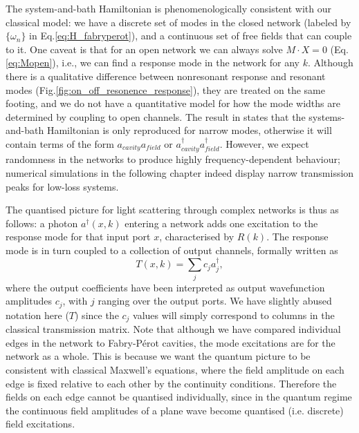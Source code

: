 The system-and-bath Hamiltonian is phenomenologically consistent with our  classical model: we have a discrete set of modes in the closed network (labeled by $\{\omega_n\}$ in Eq.\ref{eq:H_fabryperot}), and a continuous set of free fields that can couple to it. One caveat is that for an open network we can always solve $M\cdot X=0$ (Eq.\ref{eq:Mopen}), i.e., we can find a response mode in the network for any $k$. Although there is a qualitative difference between nonresonant response and resonant modes (Fig.\ref{fig:on_off_resonence_response}), they are treated on the same footing, and we do not have a quantitative model for how the mode widths are determined by coupling to open channels. The result in \cite{Viviescas2003} states that the systems-and-bath Hamiltonian is only reproduced for narrow modes, otherwise it will contain terms of the form $a_{cavity}a_{field}$ or $a_{cavity}^\dagger a_{field}^\dagger$. However, we expect randomness in the networks to produce highly frequency-dependent behaviour; numerical simulations in the following chapter indeed display narrow transmission peaks for low-loss systems. 

The quantised picture for light scattering through complex networks is thus as follows: a photon $a^\dagger(x,k)$ entering a network adds one excitation to the response mode for that input port $x$, characterised by $R(k)$. The response mode is in turn coupled to a collection of output channels, formally written as 
\begin{equation}
\label{eq:output_wf}
    T(x,k)=\sum_j c_j a_j^\dagger,
\end{equation}
where the output coefficients have been interpreted as output wavefunction amplitudes $c_j$, with $j$ ranging over the output ports. We have slightly abused notation here ($T$) since the $c_j$ values will simply correspond to columns in the classical transmission matrix. Note that although we have compared individual edges in the network to Fabry-P\'erot cavities, the mode excitations are for the network as a whole. This is because we want the quantum picture to be consistent with classical Maxwell's equations, where the field amplitude on each edge is fixed relative to each other by the continuity conditions. Therefore the fields on each edge cannot be quantised individually, since in the quantum regime the continuous field amplitudes of a plane wave become quantised (i.e. discrete) field excitations. 

